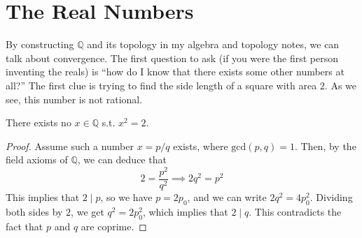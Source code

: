 \section{The Real Numbers}

  By constructing $\mathbb{Q}$ and its topology in my algebra and topology notes, we can talk about convergence. The first question to ask (if you were the first person inventing the reals) is ``how do I know that there exists some other numbers at all?'' The first clue is trying to find the side length of a square with area $2$. As we see, this number is not rational. 

  \begin{theorem}
    There exists no $x \in \mathbb{Q}$ s.t. $x^2 = 2$. 
  \end{theorem}
  \begin{proof}
    Assume such a number $x = p/q$ exists, where $\mathrm{gcd}(p, q) = 1$. Then, by the field axioms of $\mathbb{Q}$, we can deduce that 
    \begin{equation}
      2 = \frac{p^2}{q^2} \implies 2 q^2 = p^2
    \end{equation}
    This implies that $2 \mid p$, so we have $p = 2p_0$, and we can write $2 q^2 = 4 p_0^2$. Dividing both sides by $2$, we get $q^2 = 2p_0^2$, which implies that $2 \mid q$. This contradicts the fact that $p$ and $q$ are coprime. 
  \end{proof} 

